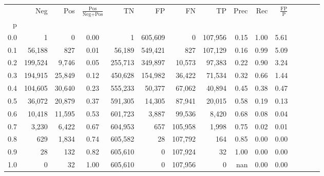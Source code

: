 \begin{tabular}{rrrcrrrrrrrrrrr}
\toprule
{} &      Neg &     Pos & $\frac{\text{Pos}}{\text{Neg}+\text{Pos}}$ &       TN &       FP &       FN &       TP &  Prec &   Rec & $\frac{\text{FP}}{\text{P}}$ \\
p   &          &         &                                            &          &          &          &          &       &       &                              \\
\midrule
0.0 &        1 &       0 &                                       0.00 &        1 &  605,609 &        0 &  107,956 &  0.15 &  1.00 &                         5.61 \\
0.1 &   56,188 &     827 &                                       0.01 &   56,189 &  549,421 &      827 &  107,129 &  0.16 &  0.99 &                         5.09 \\
0.2 &  199,524 &   9,746 &                                       0.05 &  255,713 &  349,897 &   10,573 &   97,383 &  0.22 &  0.90 &                         3.24 \\
0.3 &  194,915 &  25,849 &                                       0.12 &  450,628 &  154,982 &   36,422 &   71,534 &  0.32 &  0.66 &                         1.44 \\
0.4 &  104,605 &  30,640 &                                       0.23 &  555,233 &   50,377 &   67,062 &   40,894 &  0.45 &  0.38 &                         0.47 \\
0.5 &   36,072 &  20,879 &                                       0.37 &  591,305 &   14,305 &   87,941 &   20,015 &  0.58 &  0.19 &                         0.13 \\
0.6 &   10,418 &  11,595 &                                       0.53 &  601,723 &    3,887 &   99,536 &    8,420 &  0.68 &  0.08 &                         0.04 \\
0.7 &    3,230 &   6,422 &                                       0.67 &  604,953 &      657 &  105,958 &    1,998 &  0.75 &  0.02 &                         0.01 \\
0.8 &      629 &   1,834 &                                       0.74 &  605,582 &       28 &  107,792 &      164 &  0.85 &  0.00 &                         0.00 \\
0.9 &       28 &     132 &                                       0.82 &  605,610 &        0 &  107,924 &       32 &  1.00 &  0.00 &                         0.00 \\
1.0 &        0 &      32 &                                       1.00 &  605,610 &        0 &  107,956 &        0 &   nan &  0.00 &                         0.00 \\
\bottomrule
\end{tabular}
